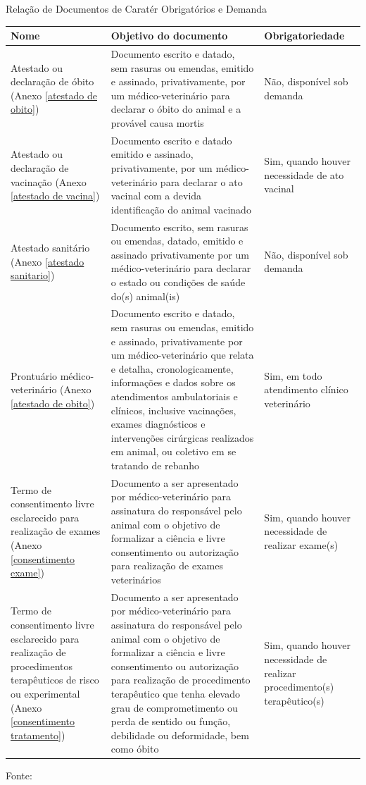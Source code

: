 \documentclass[
    12pt,               %
    openright,          %
    oneside,
    a4paper,            %
    BIBLATEX,           %
    TODO,               %
    english,            %
    brazil              %
    ]{ifsp-spo-inf-ctds}
\begin{document}
\begin{center}
    \begin{quadro}[H]
    \caption{Relação de Documentos de Caratér Obrigatórios e Demanda}
    \label{doc_obrigatorio_demanda}
    \begin{tabulary}{1.0\textwidth}{|p{10em}|p{15em}|p{10em}|}
    \hline
    Nome & Objetivo do documento & Obrigatoriedade\\
    \hline
    Atestado ou declaração de óbito (Anexo \ref{atestado de obito}) & Documento escrito e datado, sem rasuras ou emendas, emitido e assinado, privativamente, por um médico-veterinário para declarar o óbito do animal e a provável causa mortis & Não, disponível sob demanda\\
    \hline
    Atestado ou declaração de vacinação (Anexo \ref{atestado de vacina}) & Documento escrito e datado emitido e assinado, privativamente, por um médico-veterinário para declarar o ato vacinal com a devida identificação do animal vacinado & Sim, quando houver necessidade de ato vacinal\\
    \hline
    Atestado sanitário (Anexo \ref{atestado sanitario}) & Documento escrito, sem rasuras ou emendas, datado, emitido e assinado privativamente por um médico-veterinário para declarar o estado ou condições de saúde do(s) animal(is) & Não, disponível sob demanda\\
    \hline
    Prontuário médico-veterinário (Anexo \ref{atestado de obito}) & Documento escrito e datado, sem rasuras ou emendas, emitido e assinado, privativamente por um médico-veterinário que relata e detalha, cronologicamente, informações e dados sobre os atendimentos ambulatoriais e clínicos, inclusive vacinações, exames diagnósticos e intervenções cirúrgicas realizados em animal, ou coletivo em se tratando de rebanho & Sim, em todo atendimento clínico veterinário\\
    \hline
    Termo de consentimento livre esclarecido para realização de exames (Anexo \ref{consentimento exame}) & Documento a ser apresentado por médico-veterinário para assinatura do responsável pelo animal com o objetivo de formalizar a ciência e livre consentimento ou autorização para realização de exames veterinários & Sim, quando houver necessidade de realizar exame(s)\\
    \hline
    Termo de consentimento livre esclarecido para realização de procedimentos terapêuticos de risco ou experimental (Anexo \ref{consentimento tratamento}) & Documento a ser apresentado por médico-veterinário para assinatura do responsável pelo animal com o objetivo de formalizar a ciência e livre consentimento ou autorização para realização de procedimento terapêutico que tenha elevado grau de comprometimento ou perda de sentido ou função, debilidade ou deformidade, bem como óbito & Sim, quando houver necessidade de realizar procedimento(s) terapêutico(s)\\
    \hline
    \end{tabulary}
    \centering
    \footnotesize {Fonte: }
    \end{quadro}
\end{center}
\end{document}
